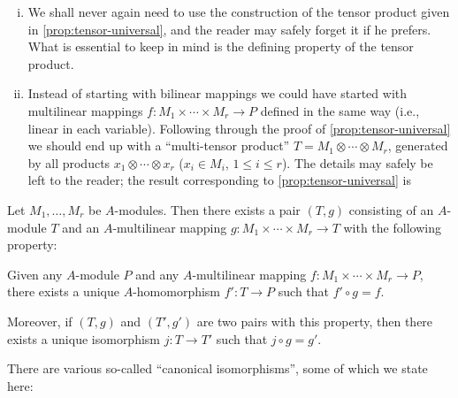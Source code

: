 \begin{remark}
\begin{enumerate}[i)]
    \item We shall never again need to use the construction of the tensor product given in \eqref{prop:tensor-universal}, and the reader may safely forget it if he prefers. What is essential to keep in mind is the defining property of the tensor product.
    \item Instead of starting with bilinear mappings we could have started with multilinear mappings $f: M_1 \times \cdots \times M_r \to P$ defined in the same way (i.e., linear in each variable). Following through the proof of \eqref{prop:tensor-universal} we should end up with a ``multi-tensor product'' $T = M_1 \otimes \cdots \otimes M_r$, generated by all products $x_1 \otimes \cdots \otimes x_r$ ($x_i \in M_i$, $1 \leq i \leq r$). The details may safely be left to the reader; the result corresponding to \eqref{prop:tensor-universal} is
\end{enumerate}
\end{remark}
\bgroup
    \let\savedtheproposition\theproposition
    \let\savedtheHproposition\theHproposition   %
    
    \addtocounter{proposition}{-2}      %
    
    \renewcommand{\theproposition}{\savedtheproposition*}
    \renewcommand{\theHproposition}{\savedtheHproposition.star} 
  \begin{proposition}\label{prop:multilinear-tensor}
    Let $M_1, \dots, M_r$ be $A$-modules. Then there exists a pair $(T, g)$ consisting of an $A$-module $T$ and an $A$-multilinear mapping $g: M_1 \times \cdots \times M_r \to T$ with the following property:

        Given any $A$-module $P$ and any $A$-multilinear mapping $f: M_1 \times \cdots \times M_r \to P$, there exists a unique $A$-homomorphism $f': T \to P$ such that $f' \circ g = f$.

        Moreover, if $(T, g)$ and $(T', g')$ are two pairs with this property, then there exists a unique isomorphism $j: T \to T'$ such that $j \circ g = g'$.
    \end{proposition}
\egroup
\addtocounter{proposition}{1}%


There are various so-called ``canonical isomorphisms'', some of which we state here:

